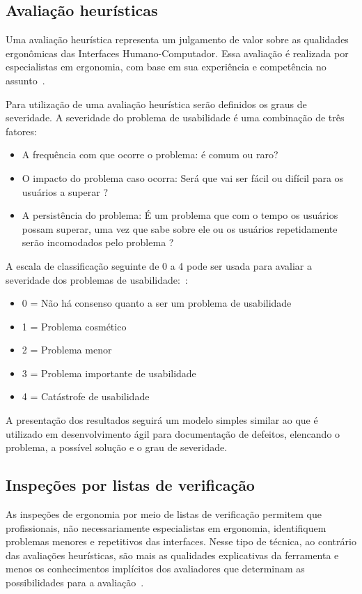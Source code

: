 \subsection{Avaliação heurísticas}
Uma avaliação heurística representa um julgamento de valor sobre as qualidades
ergonômicas das Interfaces Humano-Computador. Essa avaliação é realizada por
especialistas em ergonomia, com base em sua experiência e competência no
assunto~\cite{cybis2010}.

%
Para utilização de uma avaliação heurística serão definidos os graus de
severidade. A severidade do problema de usabilidade é uma combinação de três fatores:
\begin{itemize}
\item A frequência com que ocorre o problema: é comum ou raro?
\item O impacto do problema caso ocorra: Será que vai ser fácil ou difícil para os usuários a superar ?
\item A persistência do problema: É um problema que com o tempo os usuários possam superar, uma vez que sabe sobre ele ou os usuários repetidamente serão incomodados pelo problema ?
\end{itemize}

A escala de classificação seguinte de 0 a 4 pode ser usada para avaliar a severidade dos problemas de usabilidade:~\cite{nielsen1995severity}:

\begin{itemize}

    \item 0 = Não há consenso quanto a ser um problema de usabilidade

    \item 1 = Problema cosmético

    \item 2 = Problema menor
	
    \item 3 = Problema importante de usabilidade

    \item 4 = Catástrofe de usabilidade

\end{itemize}

A presentação dos resultados seguirá um modelo simples similar ao que é
utilizado em desenvolvimento ágil para documentação de defeitos, elencando o
problema, a possível solução e o grau de severidade.

\subsection{Inspeções por listas de verificação}
As inspeções de ergonomia por meio de listas de verificação permitem que
profissionais, não necessariamente especialistas em ergonomia, identifiquem
problemas menores e repetitivos das interfaces.
%
Nesse tipo de técnica, ao contrário das avaliações heurísticas, são mais as
qualidades explicativas da ferramenta e menos os conhecimentos implícitos dos
avaliadores que determinam as possibilidades para a avaliação~\cite{cybis2010}.

